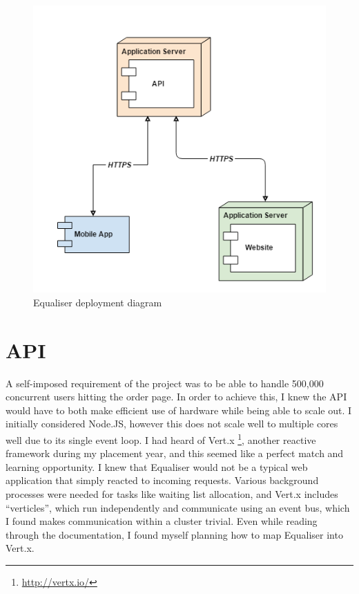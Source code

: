 \documentclass[12pt,a4paper]{bhamdissertation}
\begin{document}
\begin{figure}[ht]
    \centering
    \includegraphics[resolution=120]{img/architecture.png}
    \caption{Equaliser deployment diagram}
\end{figure}

\section{API}

A self-imposed requirement of the project was to be able to handle 500,000 concurrent users hitting the order page. In order to achieve this, I knew the API would have to both make efficient use of hardware while being able to scale out. I initially considered Node.JS, however this does not scale well to multiple cores well due to its single event loop. I had heard of Vert.x \footnote{\url{http://vertx.io/}}, another reactive framework during my placement year, and this seemed like a perfect match and learning opportunity. I knew that Equaliser would not be a typical web application that simply reacted to incoming requests. Various background processes were needed for tasks like waiting list allocation, and Vert.x includes ``verticles'', which run independently and communicate using an event bus, which I found makes communication within a cluster trivial. Even while reading through the documentation, I found myself planning how to map Equaliser into Vert.x.
\end{document}
